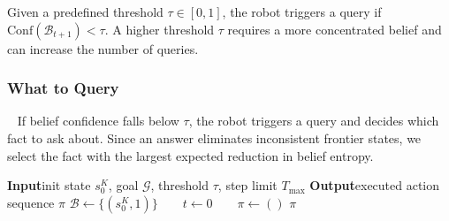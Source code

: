 Given a predefined threshold $\tau\in[0,1]$, the robot triggers a query if
$\mathrm{Conf}(\mathcal{B}_{t+1})<\tau.$
A higher threshold $\tau$ requires a more concentrated belief and can increase the number of queries.









\subsubsection{What to Query}~\label{method:what}
If belief confidence falls below $\tau$, the robot triggers a query and decides which fact to ask about. Since an answer eliminates inconsistent frontier states, we select the fact with the largest expected reduction in belief entropy.

\begin{algorithm}[t]
\caption{Planning and Querying}
\label{alg:online_planning}
\DontPrintSemicolon
\textbf{Input}\quad init state $s_0^{K}$, goal $\mathcal{G}$, threshold $\tau$, step limit $T_{\max}$\;
\textbf{Output}\quad executed action sequence $\pi$\;
\BlankLine
$\mathcal{B}\gets\{(s_0^{K},1)\}\qquad t\gets0\qquad \pi\gets()$\label{alg1_planning:initialize}\;
\KwRet $\pi$\label{alg1_planning:return}\;
\end{algorithm}



